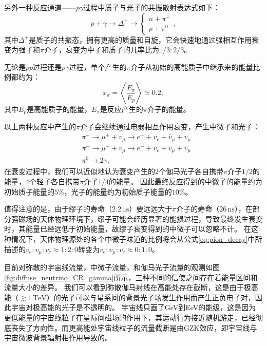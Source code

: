 另外一种反应通道——$p\gamma$过程中质子与光子的共振散射表达式如下：
\begin{equation}
    p+\gamma \rightarrow \Delta^{+} 
    \rightarrow\left\{
    \begin{array}{l}
        n+\pi^{+} \\
        p+\pi^0
    \end{array}
    \right. ,
    \label{eq:pgamma_interaction}
\end{equation}
其中$\Delta^{+}$是质子的共振态，拥有更高的质量和自旋，它会快速地通过强相互作用衰变为强子和$\pi$介子，衰变为中子和质子的几率比为$1/3 : 2/3$。

无论是$pp$过程还是$p\gamma$过程，单个产生的$\pi$介子从初始的高能质子中继承来的能量比例都约为：
\begin{equation}
    x_\pi = \left \langle \frac{E_\pi}{E_p} \right \rangle \simeq 0.2 ,
\end{equation}
其中$E_p$是高能质子的能量，$E_\pi$是反应产生的$\pi$介子的能量。

以上两种反应中产生的$\pi$介子会继续通过电弱相互作用衰变，产生中微子和光子：
\begin{equation}
    \begin{aligned}
        & \pi^{+} \rightarrow \mu^{+}+v_\mu \rightarrow e^{+}+v_e+\bar{v}_\mu+v_\mu \\
        & \pi^{-} \rightarrow \mu^{-}+\bar{v}_\mu \rightarrow e^{-}+\bar{v}_e+v_\mu+\bar{v}_\mu \\
        & \pi^0 \rightarrow 2 \gamma ,
        \label{eq:pion_decay}
    \end{aligned}
\end{equation}
在衰变过程中，我们可以近似地认为衰变产生的2个伽马光子各自携带$\pi$介子$1/2$的能量，4个轻子各自携带$\pi$介子$1/4$的能量。
因此最终反应得到的中微子的能量约为初始质子能量的$5\%$，光子的能量约为初始质子能量的$10\%$。

值得注意的是，由于缪子的寿命（$2.2\,\mathrm{\mu s}$）要远远大于$\pi$介子的寿命（$26\,\mathrm{ns}$），在部分强磁场的天体物理环境下，缪子可能会经历显著的能损过程，导致最终发生衰变时，其能量已经远低于初始能量，故缪子衰变得到的中微子可以忽略不计\cite{muon_damp:2005}。
在这种情况下，天体物理源处的各个中微子味道的比例将会从公式\ref{eq:pion_decay}中所描述的$v_e: v_\mu: v_\tau \approx 1: 2: 0$转变为$v_e: v_\mu: v_\tau \approx 0: 1: 0$。

目前对弥散的宇宙线流量，中微子流量，和伽马光子流量的观测如图\ref{fig:diffuse_neutrino_CR_gamma}所示，三种不同的信使之间存在着能量区间和流量大小的差异。
我们可以看到弥散伽马射线在高能处存在截断，这是由于极高能（$\gtrsim 1\,\mathrm{TeV}$）的光子可以与星系间的背景光子场发生作用而产生正负电子对，因此宇宙对极高能的光子是不透明的。
宇宙线只画了GeV到EeV的能级，这是因为更低能量的宇宙线粒子在星际间磁场的作用下，其运动行为接近随机游走，已经彻底丧失了方向性。而更高能处宇宙线粒子的流量截断是由GZK效应，即宇宙线与宇宙微波背景辐射相作用导致的\cite{GZK_G:1966, GZK_ZK:1966}。

